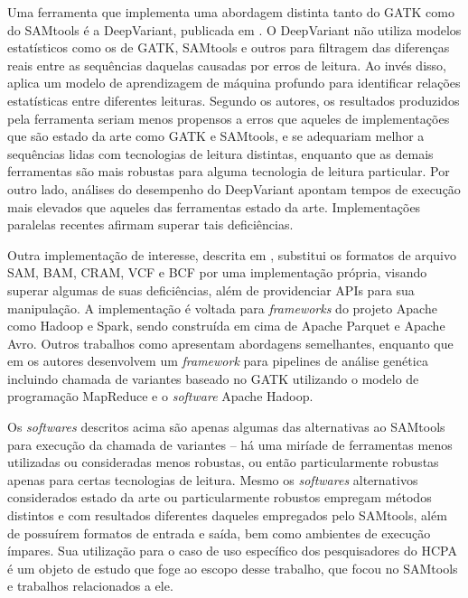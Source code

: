 \documentclass[cic,tc]{iiufrgs}
\begin{document}

Uma ferramenta que implementa uma abordagem distinta tanto do GATK como do
SAMtools é a DeepVariant, publicada em \cite{poplin2018universal}. O DeepVariant
não utiliza modelos estatísticos como os de GATK, SAMtools e outros para
filtragem das diferenças reais entre as sequências daquelas causadas por erros
de leitura. Ao invés disso, aplica um modelo de aprendizagem de máquina
profundo para identificar relações estatísticas entre diferentes leituras.
Segundo os autores, os resultados produzidos pela ferramenta seriam menos
propensos a erros que aqueles de implementações que são estado da arte como
GATK e SAMtools, e se adequariam melhor a sequências lidas com tecnologias de
leitura distintas, enquanto que as demais ferramentas são mais robustas para
alguma tecnologia de leitura particular. Por outro lado, análises do desempenho
do DeepVariant apontam tempos de execução mais elevados que aqueles das
ferramentas estado da arte. Implementações paralelas recentes afirmam superar
tais deficiências. \cite{ahmad2021vc}

Outra implementação de interesse, descrita em \cite{massie2013adam}, substitui
os formatos de arquivo SAM, BAM, CRAM, VCF e BCF por uma implementação própria,
visando superar algumas de suas deficiências, além de providenciar APIs para
sua manipulação. A implementação é voltada para \textit{frameworks} do projeto Apache
como Hadoop e Spark, sendo construída em cima de Apache Parquet e Apache Avro.
Outros trabalhos como \cite{boufea2017managing} apresentam abordagens
semelhantes, enquanto que em \cite{decap2015halvade} os autores desenvolvem um
\textit{framework} para pipelines de análise genética incluindo chamada de variantes
baseado no GATK utilizando o modelo de programação MapReduce e o \textit{software}
Apache Hadoop.

Os \textit{softwares} descritos acima são apenas algumas das alternativas ao SAMtools
para execução da chamada de variantes -- há uma miríade de ferramentas menos
utilizadas ou consideradas menos robustas, ou então particularmente robustas
apenas para certas tecnologias de leitura. Mesmo os \textit{softwares} alternativos
considerados estado da arte ou particularmente robustos empregam métodos
distintos e com resultados diferentes daqueles empregados pelo SAMtools, além
de possuírem formatos de entrada e saída, bem como ambientes de execução
ímpares. Sua utilização para o caso de uso específico dos pesquisadores do HCPA
é um objeto de estudo que foge ao escopo desse trabalho, que focou no SAMtools
e trabalhos relacionados a ele.
\end{document}
